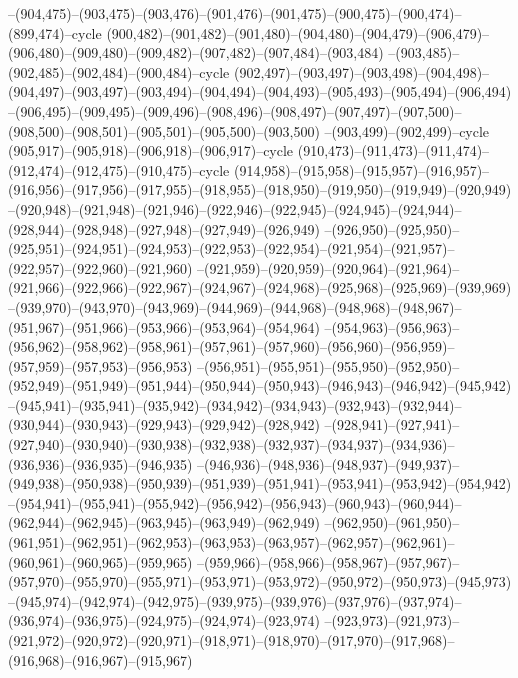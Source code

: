 --(904,475)--(903,475)--(903,476)--(901,476)--(901,475)--(900,475)--(900,474)--(899,474)--cycle
(900,482)--(901,482)--(901,480)--(904,480)--(904,479)--(906,479)--(906,480)--(909,480)--(909,482)--(907,482)--(907,484)--(903,484)
--(903,485)--(902,485)--(902,484)--(900,484)--cycle
(902,497)--(903,497)--(903,498)--(904,498)--(904,497)--(903,497)--(903,494)--(904,494)--(904,493)--(905,493)--(905,494)--(906,494)
--(906,495)--(909,495)--(909,496)--(908,496)--(908,497)--(907,497)--(907,500)--(908,500)--(908,501)--(905,501)--(905,500)--(903,500)
--(903,499)--(902,499)--cycle
(905,917)--(905,918)--(906,918)--(906,917)--cycle
(910,473)--(911,473)--(911,474)--(912,474)--(912,475)--(910,475)--cycle
(914,958)--(915,958)--(915,957)--(916,957)--(916,956)--(917,956)--(917,955)--(918,955)--(918,950)--(919,950)--(919,949)--(920,949)
--(920,948)--(921,948)--(921,946)--(922,946)--(922,945)--(924,945)--(924,944)--(928,944)--(928,948)--(927,948)--(927,949)--(926,949)
--(926,950)--(925,950)--(925,951)--(924,951)--(924,953)--(922,953)--(922,954)--(921,954)--(921,957)--(922,957)--(922,960)--(921,960)
--(921,959)--(920,959)--(920,964)--(921,964)--(921,966)--(922,966)--(922,967)--(924,967)--(924,968)--(925,968)--(925,969)--(939,969)
--(939,970)--(943,970)--(943,969)--(944,969)--(944,968)--(948,968)--(948,967)--(951,967)--(951,966)--(953,966)--(953,964)--(954,964)
--(954,963)--(956,963)--(956,962)--(958,962)--(958,961)--(957,961)--(957,960)--(956,960)--(956,959)--(957,959)--(957,953)--(956,953)
--(956,951)--(955,951)--(955,950)--(952,950)--(952,949)--(951,949)--(951,944)--(950,944)--(950,943)--(946,943)--(946,942)--(945,942)
--(945,941)--(935,941)--(935,942)--(934,942)--(934,943)--(932,943)--(932,944)--(930,944)--(930,943)--(929,943)--(929,942)--(928,942)
--(928,941)--(927,941)--(927,940)--(930,940)--(930,938)--(932,938)--(932,937)--(934,937)--(934,936)--(936,936)--(936,935)--(946,935)
--(946,936)--(948,936)--(948,937)--(949,937)--(949,938)--(950,938)--(950,939)--(951,939)--(951,941)--(953,941)--(953,942)--(954,942)
--(954,941)--(955,941)--(955,942)--(956,942)--(956,943)--(960,943)--(960,944)--(962,944)--(962,945)--(963,945)--(963,949)--(962,949)
--(962,950)--(961,950)--(961,951)--(962,951)--(962,953)--(963,953)--(963,957)--(962,957)--(962,961)--(960,961)--(960,965)--(959,965)
--(959,966)--(958,966)--(958,967)--(957,967)--(957,970)--(955,970)--(955,971)--(953,971)--(953,972)--(950,972)--(950,973)--(945,973)
--(945,974)--(942,974)--(942,975)--(939,975)--(939,976)--(937,976)--(937,974)--(936,974)--(936,975)--(924,975)--(924,974)--(923,974)
--(923,973)--(921,973)--(921,972)--(920,972)--(920,971)--(918,971)--(918,970)--(917,970)--(917,968)--(916,968)--(916,967)--(915,967)
